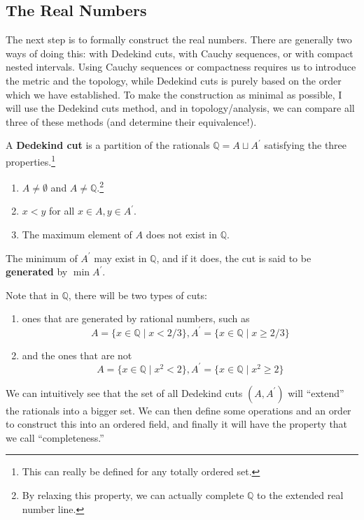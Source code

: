\subsection{The Real Numbers}

  The next step is to formally construct the real numbers. There are generally two ways of doing this: with Dedekind cuts, with Cauchy sequences, or with compact nested intervals. Using Cauchy sequences or compactness requires us to introduce the metric and the topology, while Dedekind cuts is purely based on the order which we have established. To make the construction as minimal as possible, I will use the Dedekind cuts method, and in topology/analysis, we can compare all three of these methods (and determine their equivalence!). 

  \begin{definition} 
    A \textbf{Dedekind cut} is a partition of the rationals $\mathbb{Q} = A \sqcup A^\prime$ satisfying the three properties.\footnote{This can really be defined for any totally ordered set. } 
    \begin{enumerate}
      \item $A \neq \emptyset$ and $A \neq \mathbb{Q}$.\footnote{By relaxing this property, we can actually complete $\mathbb{Q}$ to the extended real number line. }
      \item $x < y$ for all $x \in A, y \in A^\prime$. 
      \item The maximum element of $A$ does not exist in $\mathbb{Q}$. 
    \end{enumerate}
    The minimum of $A^\prime$ may exist in $\mathbb{Q}$, and if it does, the cut is said to be \textbf{generated} by $\min A^\prime$. 
  \end{definition}

  Note that in $\mathbb{Q}$, there will be two types of cuts: 
  \begin{enumerate}
    \item ones that are generated by rational numbers, such as 
    \begin{equation}
      A = \{x \in \mathbb{Q} \mid x < 2/3 \}, A^\prime = \{ x \in \mathbb{Q} \mid x \geq 2/3 \} 
    \end{equation}
    \item and the ones that are not 
    \begin{equation}
      A = \{x \in \mathbb{Q} \mid x^2 < 2 \}, A^\prime = \{x \in \mathbb{Q} \mid x^2 \geq 2 \}
    \end{equation}
  \end{enumerate}
  We can intuitively see that the set of all Dedekind cuts $(A, A^\prime)$ will ``extend'' the rationals into a bigger set. We can then define some operations and an order to construct this into an ordered field, and finally it will have the property that we call ``completeness.''

